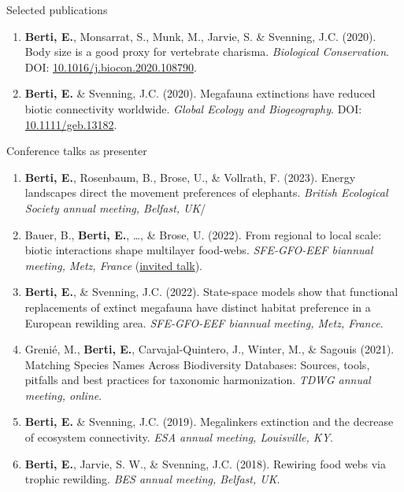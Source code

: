 \documentclass{resume} %
\begin{document}
\begin{rSection}{Selected publications}
\begin{enumerate}
    \item \textbf{Berti, E.}, Monsarrat, S., Munk, M., Jarvie, S. \& Svenning, J.C. (2020). Body size is a good proxy for vertebrate charisma. \textit{Biological Conservation}. DOI: \href{https://doi.org/10.1016/j.biocon.2020.108790}{10.1016/j.biocon.2020.108790}.
    \item \textbf{Berti, E.} \& Svenning, J.C. (2020). Megafauna extinctions have reduced biotic connectivity worldwide. \textit{Global Ecology and Biogeography}. DOI: \href{https://doi.org/10.1111/geb.13182}{10.1111/geb.13182}.
\end{enumerate}
\end{rSection}

\begin{rSection}{Conference talks as presenter}
\begin{enumerate}
    \setlength\itemsep{-0.5em}
    \item \textbf{Berti, E.}, Rosenbaum, B., Brose, U., \& Vollrath, F. (2023). Energy landscapes direct the movement preferences of elephants. \textit{British Ecological Society annual meeting, Belfast, UK}/
    \item Bauer, B., \textbf{Berti, E.}, \dots, \& Brose, U. (2022). From regional to local scale: biotic interactions shape multilayer food-webs. \textit{SFE-GFO-EEF biannual meeting, Metz, France} (\underline{invited talk}).
    \item \textbf{Berti, E.}, \& Svenning, J.C. (2022). State-space models show that functional replacements of extinct megafauna have distinct habitat preference in a European rewilding area. \textit{SFE-GFO-EEF biannual meeting, Metz, France}.
    \item Grenié, M., \textbf{Berti, E.}, Carvajal-Quintero, J., Winter, M., \& Sagouis (2021). Matching Species Names Across Biodiversity Databases: Sources, tools, pitfalls and best practices for taxonomic harmonization. \textit{TDWG annual meeting, online}.
    \item \textbf{Berti, E.} \& Svenning, J.C. (2019). Megalinkers extinction and the decrease of ecosystem connectivity. \textit{ESA annual meeting, Louisville, KY}.
    \item \textbf{Berti, E.}, Jarvie, S. W., \& Svenning, J.C. (2018). Rewiring food webs via trophic rewilding. \textit{BES annual meeting, Belfast, UK}.
\end{enumerate}
\end{rSection}
\end{document}
